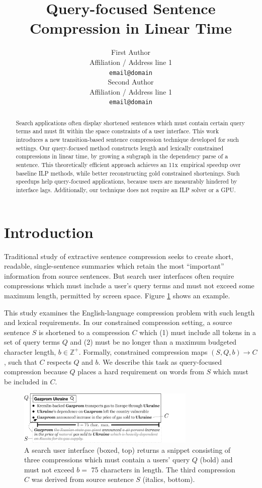 \documentclass[11pt,a4paper]{article}
\title{Query-focused Sentence Compression in Linear Time}
\author{First Author \\
  Affiliation / Address line 1 \\
  {\tt email@domain} \\\And
  Second Author \\
  Affiliation / Address line 1 \\
  {\tt email@domain} \\}
\date{}
\newcommand{\speedup}[0]{11x~}
\begin{document}
\maketitle
\begin{abstract}
Search applications often display shortened sentences which must contain certain query terms and must fit within the space constraints of a user interface. This work introduces a new transition-based sentence compression technique developed for such settings. Our query-focused method constructs length and lexically constrained compressions in linear time, by growing a subgraph in the dependency parse of a sentence. This theoretically efficient approach achieves an \speedup empirical speedup over baseline ILP methods, while better reconstructing gold constrained shortenings. Such speedups help query-focused applications, because users are measurably hindered by interface lags. Additionally, our technique does not require an ILP solver or a GPU.
\end{abstract}


\section{Introduction}\label{s:intro}

Traditional study of extractive sentence compression seeks to create short, readable, single-sentence summaries which retain the most ``important'' information from source sentences. But search user interfaces often require compressions which must include a user's query terms and must not exceed some maximum length, permitted by screen space.  Figure \ref{f:qf} shows an example.

This study examines the English-language compression problem with such length and lexical requirements. In our constrained compression setting, a source sentence $S$ is shortened to a compression $C$ which (1) must include all tokens in a set of query terms $Q$ and (2) must be no longer than a maximum budgeted character length, $b \in \mathbb{Z}^{+}$. Formally, constrained compression maps $(S,Q,b) \rightarrow C$, such that $C$ respects $Q$ and $b$. We describe this task as query-focused compression because $Q$ places a hard requirement on words from $S$ which must be included in $C$.

\begin{figure}[htb!]
\includegraphics[width=8.5cm]{qf.pdf}
\caption{A search user interface (boxed, top) returns a snippet consisting of three compressions which must contain a users' query $Q$ (bold) and must not exceed $b=$ 75 characters in length. The third compression $C$ was derived from source sentence $S$ (italics, bottom).}
\label{f:qf}
\end{figure}
\end{document}
